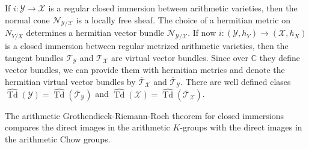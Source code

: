 \documentclass[10pt,twoside]{article}
\numberwithin{equation}{section}
\theoremstyle{plain}
\theoremstyle{definition}
\DeclareMathOperator{\Td}{Td}
\begin{document}
If $i\colon \mathcal{Y}\longrightarrow \mathcal{X}$ is a regular closed immersion
between arithmetic varieties, then the normal cone
$\mathcal{N}_{\mathcal{Y}/\mathcal{X}}$ is a locally free sheaf. The
choice of 
a hermitian metric on $N_{Y/X}$ determines a hermitian vector bundle
$\overline {\mathcal{N}}_{\mathcal{Y}/\mathcal{X}}$. If now
$i\colon (\mathcal{Y},h_{Y})\longrightarrow (\mathcal{X},h_{X})$ is a closed
immersion 
between regular metrized arithmetic varieties, then the tangent
bundles ${\mathcal{T}}_{\mathcal{Y}}$ and
${\mathcal{T}}_{\mathcal{X}}$ are virtual vector bundles. Since over
$\mathbb{C}$ they define vector bundles, we can provide them with
hermitian metrics and denote the
hermitian virtual vector bundles by $\overline {\mathcal{T}}_{\mathcal{X}}$ and 
$\overline {\mathcal{T}}_{\mathcal{Y}}$. There are well defined clases
$\widehat 
{\Td}(\mathcal{Y})= \widehat
{\Td}(\overline {\mathcal{T}}_{\mathcal{Y}})$ and $\widehat
{\Td}(\mathcal{X})= \widehat
{\Td}(\overline {\mathcal{T}}_{\mathcal{X}})$. 
 
The arithmetic Grothendieck-Riemann-Roch theorem for closed immersions
compares the direct images in the arithmetic $K$-groups with
the 
direct images in the arithmetic Chow groups.
\end{document}
